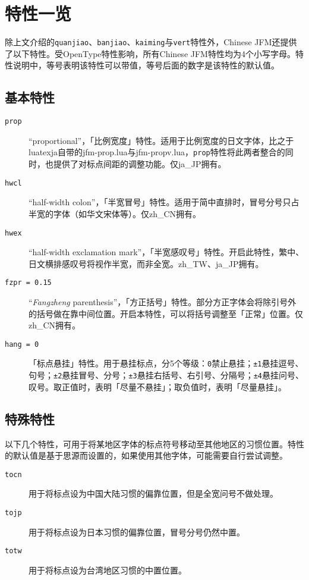 \documentclass[a4paper , zihao=-4 , fontset=adobe , punct=zh_CN/kaiming]{ctexart}
\begin{document}
\section{特性一览}
除上文介绍的\+\verb|quanjiao|、\verb|banjiao|、\verb|kaiming|与\+\verb|vert|特性外，\textsf{Chinese JFM}还提供了以下特性。受OpenType特性影响，所有\textsf{Chinese JFM}特性均为4个小写字母。特性说明中，等号表明该特性可以带值，等号后面的数字是该特性的默认值。

\subsection{基本特性}
\begin{description}
    \item[\texttt{prop}] ``proportional''，「比例宽度」特性。适用于比例宽度的日文字体，比之于\textsf{lua\-texja}自带的\textsf{jfm-prop.lua}与\textsf{jfm-propv.lua}，\verb|prop|特性将此两者整合的同时，也提供了对标点间距的调整功能。仅\textsf{ja\_JP}拥有。
    \item[\texttt{hwcl}] ``half-width colon''，「半宽冒号」特性。适用于简中直排时，冒号分号只占半宽的字体（如华文宋体等）。仅\textsf{zh\_CN}拥有。
    \item[\texttt{hwex}] ``half-width exclamation mark''，「半宽感叹号」特性。开启此特性，繁中、日文横排感叹号将视作半宽，而非全宽。\textsf{zh\_TW}、\textsf{ja\_JP}拥有。
    \item[\texttt{fzpr = 0.15}] ``\textit{Fangzheng} parenthesis''，「方正括号」特性。部分方正字体会将除引号外的括号做在靠中间位置。开启本特性，可以将括号调整至「正常」位置。仅\textsf{zh\_CN}拥有。
    \item[\texttt{hang = 0}] 「标点悬挂」特性。用于悬挂标点，分5个等级：\verb|0|禁止悬挂；\verb|±1|悬挂逗号、句号；\verb|±2|悬挂冒号、分号；\verb|±3|悬挂右括号、右引号、分隔号；\verb|±4|悬挂问号、叹号。取正值时，表明「尽量不悬挂」；取负值时，表明「尽量悬挂」。
\end{description}

\subsection{特殊特性}
以下几个特性，可用于将某地区字体的标点符号移动至其他地区的习惯位置。特性的默认值是基于思源而设置的，如果使用其他字体，可能需要自行尝试调整。
\begin{description}
    \item[\texttt{tocn}] 用于将标点设为中国大陆习惯的偏靠位置，但是全宽问号不做处理。
    \item[\texttt{tojp}] 用于将标点设为日本习惯的偏靠位置，冒号分号仍然中置。
    \item[\texttt{totw}] 用于将标点设为台湾地区习惯的中置位置。
\end{description}
\end{document}
